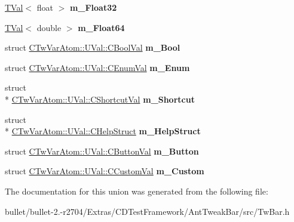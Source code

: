 \begin{DoxyCompactItemize}
\item 
\hypertarget{union_c_tw_var_atom_1_1_u_val_a25b56e81f4c94ceb68d867c8df635f6e}{\hyperlink{struct_c_tw_var_atom_1_1_t_val}{T\+Val}$<$ float $>$ {\bfseries m\+\_\+\+Float32}}\label{union_c_tw_var_atom_1_1_u_val_a25b56e81f4c94ceb68d867c8df635f6e}

\item 
\hypertarget{union_c_tw_var_atom_1_1_u_val_a15c56847dcb69516541d5b9613ccc1e4}{\hyperlink{struct_c_tw_var_atom_1_1_t_val}{T\+Val}$<$ double $>$ {\bfseries m\+\_\+\+Float64}}\label{union_c_tw_var_atom_1_1_u_val_a15c56847dcb69516541d5b9613ccc1e4}

\item 
\hypertarget{union_c_tw_var_atom_1_1_u_val_a1b6c45e75894eb14f1d655ff33a92f78}{struct \hyperlink{struct_c_tw_var_atom_1_1_u_val_1_1_c_bool_val}{C\+Tw\+Var\+Atom\+::\+U\+Val\+::\+C\+Bool\+Val} {\bfseries m\+\_\+\+Bool}}\label{union_c_tw_var_atom_1_1_u_val_a1b6c45e75894eb14f1d655ff33a92f78}

\item 
\hypertarget{union_c_tw_var_atom_1_1_u_val_a8cde8b4e17b106760ee9eecc1057340c}{struct \hyperlink{struct_c_tw_var_atom_1_1_u_val_1_1_c_enum_val}{C\+Tw\+Var\+Atom\+::\+U\+Val\+::\+C\+Enum\+Val} {\bfseries m\+\_\+\+Enum}}\label{union_c_tw_var_atom_1_1_u_val_a8cde8b4e17b106760ee9eecc1057340c}

\item 
\hypertarget{union_c_tw_var_atom_1_1_u_val_aea14594a3d15315a640b7c153c080bf1}{struct \\*
\hyperlink{struct_c_tw_var_atom_1_1_u_val_1_1_c_shortcut_val}{C\+Tw\+Var\+Atom\+::\+U\+Val\+::\+C\+Shortcut\+Val} {\bfseries m\+\_\+\+Shortcut}}\label{union_c_tw_var_atom_1_1_u_val_aea14594a3d15315a640b7c153c080bf1}

\item 
\hypertarget{union_c_tw_var_atom_1_1_u_val_a3278e097e3edd6fde9a1668f6471bb99}{struct \\*
\hyperlink{struct_c_tw_var_atom_1_1_u_val_1_1_c_help_struct}{C\+Tw\+Var\+Atom\+::\+U\+Val\+::\+C\+Help\+Struct} {\bfseries m\+\_\+\+Help\+Struct}}\label{union_c_tw_var_atom_1_1_u_val_a3278e097e3edd6fde9a1668f6471bb99}

\item 
\hypertarget{union_c_tw_var_atom_1_1_u_val_a8f5d3134930515353f467d356cee9068}{struct \hyperlink{struct_c_tw_var_atom_1_1_u_val_1_1_c_button_val}{C\+Tw\+Var\+Atom\+::\+U\+Val\+::\+C\+Button\+Val} {\bfseries m\+\_\+\+Button}}\label{union_c_tw_var_atom_1_1_u_val_a8f5d3134930515353f467d356cee9068}

\item 
\hypertarget{union_c_tw_var_atom_1_1_u_val_a15aded5a306bd0ce7cb7484ceca26c3c}{struct \hyperlink{struct_c_tw_var_atom_1_1_u_val_1_1_c_custom_val}{C\+Tw\+Var\+Atom\+::\+U\+Val\+::\+C\+Custom\+Val} {\bfseries m\+\_\+\+Custom}}\label{union_c_tw_var_atom_1_1_u_val_a15aded5a306bd0ce7cb7484ceca26c3c}

\end{DoxyCompactItemize}


The documentation for this union was generated from the following file\+:\begin{DoxyCompactItemize}
\item 
bullet/bullet-\/2.-\/r2704/\+Extras/\+C\+D\+Test\+Framework/\+Ant\+Tweak\+Bar/src/Tw\+Bar.\+h\end{DoxyCompactItemize}
